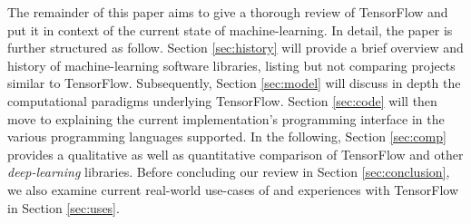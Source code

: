 The remainder of this paper aims to give a thorough review of TensorFlow and put
it in context of the current state of machine-learning. In detail, the paper is
further structured as follow. Section \ref{sec:history} will provide a brief
overview and history of machine-learning software libraries, listing but not
comparing projects similar to TensorFlow. Subsequently, Section \ref{sec:model}
will discuss in depth the computational paradigms underlying TensorFlow. Section
\ref{sec:code} will then move to explaining the current implementation's
programming interface in the various programming languages supported. In the
following, Section \ref{sec:comp} provides a qualitative as well as quantitative
comparison of TensorFlow and other \emph{deep-learning} libraries. Before
concluding our review in Section \ref{sec:conclusion}, we also examine current
real-world use-cases of and experiences with TensorFlow in Section
\ref{sec:uses}.

